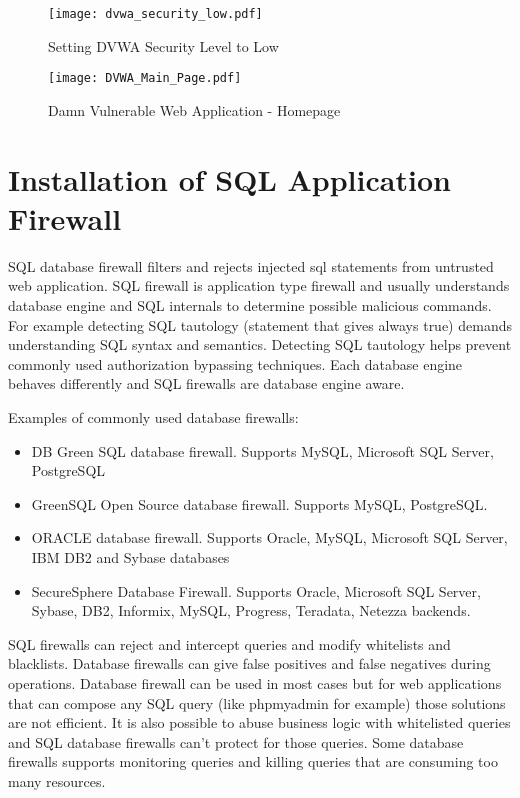 \begin{figure}[H] 
 \centering 
 \texttt{[image: dvwa\_security\_low.pdf]} 
 \caption{Setting DVWA Security Level to Low} 
 \label{Setting DVWA Security Level to Low} 
\end{figure}


\begin{figure}[H] 
 \centering 
 \texttt{[image: DVWA\_Main\_Page.pdf]} 
 \caption{Damn Vulnerable Web Application - Homepage} 
 \label{Damn Vulnerable Web Application - Homepage} 
\end{figure}


\section{Installation of SQL Application Firewall}
SQL database firewall filters and rejects injected sql statements from untrusted web application. SQL firewall is application type firewall and usually understands database engine and SQL internals to determine possible malicious commands. For example detecting  SQL tautology (statement that gives always true) demands understanding SQL syntax and semantics. Detecting SQL tautology helps prevent commonly used authorization bypassing techniques.
Each database engine behaves differently and SQL firewalls are database engine aware.


Examples of commonly used database firewalls:
\begin{itemize}
\item DB Green SQL database firewall. Supports MySQL, Microsoft SQL Server, PostgreSQL
\item GreenSQL Open Source database firewall. Supports MySQL, PostgreSQL.
\item ORACLE database firewall. Supports Oracle, MySQL, Microsoft SQL Server, IBM DB2 and Sybase databases
\item SecureSphere Database Firewall. Supports Oracle, Microsoft SQL Server, Sybase, DB2, Informix, MySQL, Progress, Teradata, Netezza backends.
\end{itemize}

SQL firewalls can reject and intercept queries and modify whitelists and blacklists. Database firewalls can give false positives and false negatives during operations. Database firewall can be used in most cases but for web applications that can compose any SQL query (like  phpmyadmin for example) those solutions are not efficient. It is also possible to abuse business logic with whitelisted queries and SQL database firewalls can’t protect for those queries.
Some database firewalls supports monitoring queries and killing queries that are consuming too many resources.

